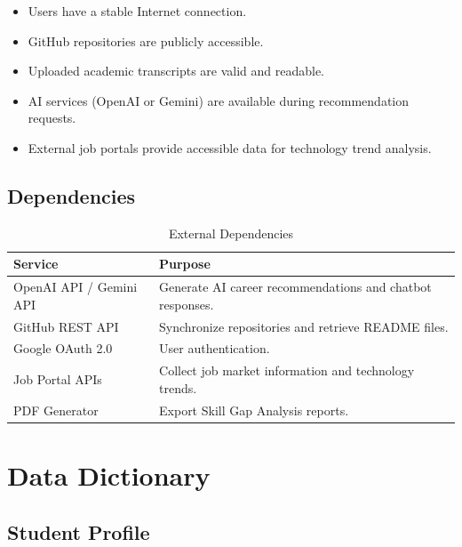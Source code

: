 \begin{itemize}
    \item Users have a stable Internet connection.
    \item GitHub repositories are publicly accessible.
    \item Uploaded academic transcripts are valid and readable.
    \item AI services (OpenAI or Gemini) are available during recommendation requests.
    \item External job portals provide accessible data for technology trend analysis.
\end{itemize}

\subsection{Dependencies}

\begin{table}[H]
\centering
\caption{External Dependencies}
\begin{tabular}{|l|p{9cm}|}
\hline
\textbf{Service} & \textbf{Purpose} \\ \hline

OpenAI API / Gemini API &
Generate AI career recommendations and chatbot responses.
\\ \hline

GitHub REST API &
Synchronize repositories and retrieve README files.
\\ \hline

Google OAuth 2.0 &
User authentication.
\\ \hline

Job Portal APIs &
Collect job market information and technology trends.
\\ \hline

PDF Generator &
Export Skill Gap Analysis reports.
\\ \hline

\end{tabular}
\end{table}


\section{Data Dictionary}

\subsection{Student Profile}

